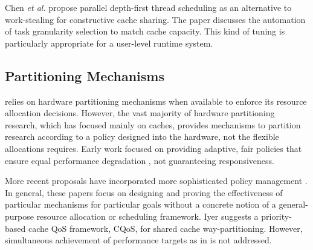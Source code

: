%










%
Chen \emph{et al.}\cite{1248396} propose parallel depth-first thread scheduling as an alternative to work-stealing for constructive cache sharing.
The paper discusses the automation of task granularity selection to match cache capacity. This kind of tuning is particularly appropriate for a user-level runtime system.

\subsection{Partitioning Mechanisms}
\label{sec:rel:pm}

%
\pacora relies on hardware partitioning mechanisms when available to enforce its resource allocation decisions.  However, the vast majority of hardware partitioning research, which has focused mainly on caches, provides mechanisms to partition research according to a policy designed into the hardware, not the flexible allocations \pacora requires.  Early work focused on providing adaptive, fair policies that ensure equal performance degradation \cite{605420,1086328} , not guaranteeing responsiveness.

More recent proposals have incorporated more sophisticated policy management \cite{1241608,1331730,1152161,1254886}. In general, these papers focus on designing and proving the effectiveness of particular mechanisms for particular goals \cite{876484, 967444,1194855,1275005,1194858,1318096,1088154,1399973,1069998,1399982} without a concrete notion of a general-purpose resource allocation or scheduling framework. 
Iyer\cite{1006246} suggests a priority-based cache QoS framework, CQoS, for shared cache way-partitioning. 
However, simultaneous achievement of performance targets as in \pacora is not addressed.

